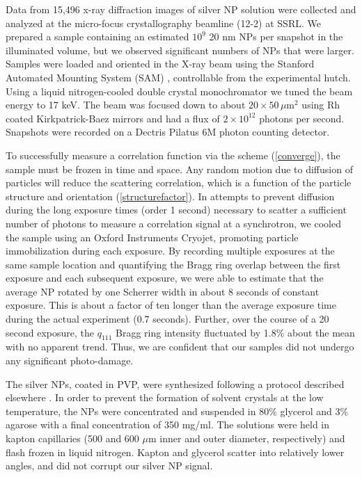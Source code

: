 \documentclass [11pt,fleqn]{article}
\begin{document}
Data from 15,496 x-ray diffraction images \cite{data} of silver NP solution were collected and analyzed at the micro-focus crystallography beamline (12-2) at SSRL. We prepared a sample containing an estimated $10^{9}$  20 nm NPs per snapshot in the illuminated volume, but we observed significant numbers of NPs that were larger. Samples were loaded and oriented in the X-ray beam using the Stanford Automated Mounting System (SAM) \cite{Cohen:2002jw}, controllable from the experimental hutch. Using a liquid nitrogen-cooled double crystal monochromator we tuned the beam energy to 17 keV. The beam was focused down to about $20 \times 50 \,\mu$m$^2$ using Rh coated Kirkpatrick-Baez mirrors and had a flux of $2\times 10^{12}$ photons per second. Snapshots were recorded on a Dectris Pilatus 6M photon counting detector. 

To successfully measure a correlation function via the scheme (\ref{converge}), the sample must be frozen in time and space. Any random motion due to diffusion of particles will reduce the scattering correlation, which is a function of the particle structure and orientation (\ref{structurefactor}). In attempts to prevent diffusion during the long exposure times (order 1 second) necessary to scatter a sufficient number of photons to measure a correlation signal at a synchrotron, we cooled the sample using an Oxford Instruments Cryojet, promoting particle immobilization during each exposure. By recording multiple exposures at the same sample location and quantifying the Bragg ring overlap between the first exposure and each subsequent exposure, we were able to estimate that the average NP rotated by one Scherrer width in about 8 seconds of constant exposure. This is about a factor of ten longer than the average exposure time during the actual experiment  (0.7 seconds).  Further, over the course of a 20 second exposure, the $q_{111}$ Bragg ring intensity fluctuated by 1.8\% about the mean with no apparent trend. Thus, we are confident that our samples did not undergo any significant photo-damage.

The silver NPs, coated in PVP, were synthesized following a protocol described elsewhere \cite{Levard:2011bx}. In order to prevent the formation of solvent crystals at the low temperature, the NPs were concentrated and suspended in 80\% glycerol and 3\% agarose with a final concentration of 350 mg/ml. The solutions were held in kapton capillaries (500 and 600 $\mu$m inner and outer diameter, respectively) and flash frozen in liquid nitrogen. Kapton and glycerol scatter into relatively lower angles, and did not corrupt our silver NP signal.
\end{document}
